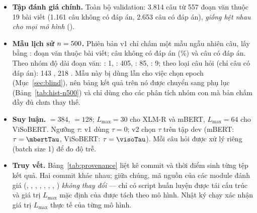 \begin{itemize}
  \item \textbf{Tập đánh giá chính.} Toàn bộ validation: 3.814 câu từ 557 đoạn văn thuộc 19 bài
        viết (1.161 câu không có đáp án, 2.653 câu có đáp án), \emph{giống hệt nhau cho mọi mô
        hình} ().
  \item \textbf{Mẫu lịch sử $n = 500$.} Phiên bản v1 chỉ chấm một mẫu ngẫu nhiên \histN{}
        câu, lấy bằng : \overlapHistContexts{} đoạn văn thuộc
        \overlapHistArticles{} bài viết; \histNoAnsN{} câu không có đáp án (\dataHistImpPct\%) và
        \histHasAnsN{} câu có đáp án. Theo nhóm độ dài đoạn văn: : 1, :
        405, : 85, : 9; theo loại câu hỏi (chỉ câu có đáp án): 143
        , 218 . Mẫu này bị dùng lẫn cho việc chọn
        epoch (Mục~\ref{sec:blind}), nên bảng kết quả trên nó được chuyển sang phụ lục
        (Bảng~\ref{tab:hist-n500}) và chỉ dùng cho các phân tích nhóm con mà bản chấm đầy đủ chưa
        thay thế.
  \item \textbf{Suy luận.}  $= 384$,  $= 128$;
        $L_{\max} = 30$ cho XLM-R và mBERT, $L_{\max} = 64$ cho ViSoBERT. Ngưỡng $\tau$: v1 dùng
        $\tau = 0$; v2 chọn $\tau$ trên tập dev\ifhasDev{} (mBERT: $\tau = \mbertTau$, ViSoBERT:
        $\tau = \visoTau$)\fi. Mỗi câu hỏi được xử lý riêng (batch size 1) để đo độ trễ.
  \item \textbf{Truy vết.} Bảng~\ref{tab:provenance} liệt kê commit và thời điểm sinh từng tệp
        kết quả. Hai commit khác nhau; giữa chúng, mã nguồn của các module đánh giá
        (, , , , ,
        , , ) \emph{không thay đổi} ---
        chỉ có script huấn luyện được tái cấu trúc và giá trị $L_{\max}$ mặc định của
         được tách theo mô hình. Nhật ký chạy xác nhận giá trị $L_{\max}$ thực tế
        của từng mô hình.
\end{itemize}

